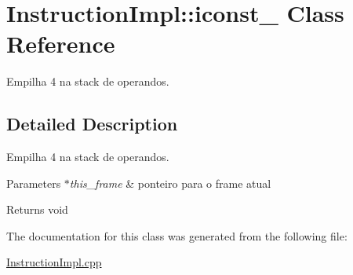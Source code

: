 \hypertarget{class_instruction_impl_1_1iconst__4}{}\section{Instruction\+Impl\+:\+:iconst\+\_ Class Reference}
\label{class_instruction_impl_1_1iconst__4}


Empilha 4 na stack de operandos.  




\subsection{Detailed Description}
Empilha 4 na stack de operandos. 


\begin{DoxyParams}{Parameters}
{\em $\ast$this\+\_\+frame} & ponteiro para o frame atual \\
\hline
\end{DoxyParams}
\begin{DoxyReturn}{Returns}
void 
\end{DoxyReturn}


The documentation for this class was generated from the following file\+:\begin{DoxyCompactItemize}
\item 
\hyperlink{_instruction_impl_8cpp}{Instruction\+Impl.\+cpp}\end{DoxyCompactItemize}
